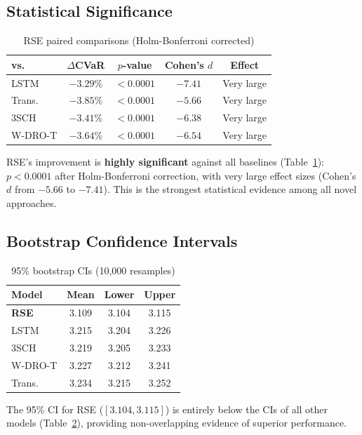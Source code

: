 \documentclass[11pt]{article}
\begin{document}
\subsection{Statistical Significance}

\begin{table}[t]
\centering
\caption{RSE paired comparisons (Holm-Bonferroni corrected)}
\label{tab:stats}
\small
\begin{tabular}{lcccc}
\toprule
\textbf{vs.} & \textbf{$\Delta$CVaR} & \textbf{$p$-value} & \textbf{Cohen's $d$} & \textbf{Effect} \\
\midrule
LSTM & $-3.29\%$ & $< 0.0001$ & $-7.41$ & Very large \\
Trans. & $-3.85\%$ & $< 0.0001$ & $-5.66$ & Very large \\
3SCH & $-3.41\%$ & $< 0.0001$ & $-6.38$ & Very large \\
W-DRO-T & $-3.64\%$ & $< 0.0001$ & $-6.54$ & Very large \\
\bottomrule
\end{tabular}
\end{table}

RSE's improvement is \textbf{highly significant} against all baselines (Table~\ref{tab:stats}): $p < 0.0001$ after Holm-Bonferroni correction, with very large effect sizes (Cohen's $d$ from $-5.66$ to $-7.41$). This is the strongest statistical evidence among all novel approaches.

\subsection{Bootstrap Confidence Intervals}

\begin{table}[t]
\centering
\caption{95\% bootstrap CIs (10,000 resamples)}
\label{tab:bootstrap}
\small
\begin{tabular}{lccc}
\toprule
\textbf{Model} & \textbf{Mean} & \textbf{Lower} & \textbf{Upper} \\
\midrule
\textbf{RSE} & 3.109 & 3.104 & 3.115 \\
LSTM & 3.215 & 3.204 & 3.226 \\
3SCH & 3.219 & 3.205 & 3.233 \\
W-DRO-T & 3.227 & 3.212 & 3.241 \\
Trans. & 3.234 & 3.215 & 3.252 \\
\bottomrule
\end{tabular}
\end{table}

The 95\% CI for RSE ($[3.104, 3.115]$) is entirely below the CIs of all other models (Table~\ref{tab:bootstrap}), providing non-overlapping evidence of superior performance.
\end{document}

